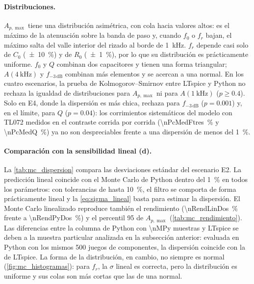 \paragraph{Distribuciones.} $A_{p,\max}$ tiene una distribución asimétrica, con cola hacia valores altos: es el máximo de la atenuación sobre la
banda de paso y, cuando $f_0$ o $f_r$ bajan, el máximo salta del valle interior del rizado al borde de \qty{1}{\kilo\hertz}. $f_r$ depende casi solo
de $C_0$ (\qty{\pm 10}{\percent}) y de $R_0$ (\qty{\pm 1}{\percent}), por lo que su distribución es prácticamente uniforme. $f_0$ y $Q$ combinan
dos capacitores y tienen una forma triangular; $A(\qty{4}{\kilo\hertz})$ y $f_{-3\,\text{dB}}$ combinan más elementos y se acercan a una normal.
En los cuatro escenarios, la prueba de Kolmogorov--Smirnov entre LTspice y Python no rechaza la igualdad de distribuciones para $A_{p,\max}$ ni para
$A(\qty{1}{\kilo\hertz})$ ($p \ge \num{0.4}$). Solo en E4, donde la dispersión es más chica, rechaza para $f_{-3\,\text{dB}}$ ($p = \num{0.001}$) y, en el límite, para $Q$
($p = \num{0.04}$): los corrimientos sistemáticos del modelo con TL072 medidos en el contraste corrida por corrida
(\qty{\nPcMedFtres}{\percent} y \qty{\nPcMedQ}{\percent}) ya no son despreciables frente a una dispersión de menos del \qty{1}{\percent}.

\paragraph{Comparación con la sensibilidad lineal (d).} La \cref{tab:mc_dispersion} compara las desviaciones estándar del escenario E2. La predicción
lineal coincide con el Monte Carlo de Python dentro del \qty{1}{\percent} en todos los parámetros: con tolerancias de hasta \qty{10}{\percent}, el
filtro se comporta de forma prácticamente lineal y la \cref{eq:sigma_lineal} basta para estimar la dispersión. El Monte Carlo linealizado reproduce
también el rendimiento (\qty{\nRendLinDos}{\percent} frente a \qty{\nRendPyDos}{\percent}) y el percentil 95 de $A_{p,\max}$
(\cref{tab:mc_rendimiento}). Las diferencias entre la columna de Python con \num{\nMPy} muestras y LTspice se deben a la muestra particular
analizada en la subsección anterior: evaluada en Python con los mismos 500 juegos de componentes, la dispersión coincide con la de LTspice. La
forma de la distribución, en cambio, no siempre es normal (\cref{fig:mc_histogramas}): para $f_r$, la $\sigma$ lineal es correcta, pero la
distribución es uniforme y sus colas son más cortas que las de una normal.

